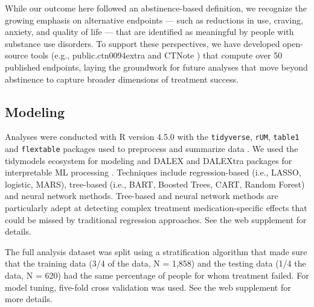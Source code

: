 \documentclass[
  number,
  preprint,
  3p,
  onecolumn]{elsarticle}
\begin{document}
While our outcome here followed an abstinence-based definition, we
recognize the growing emphasis on alternative endpoints --- such as
reductions in use, craving, anxiety, and quality of life --- that are
identified as meaningful by people with substance use disorders. To
support these perspectives, we have developed open-source tools (e.g.,
public.ctn0094extra \citep{public.ctn0094extra} and CTNote
\citep{CTNote}) that compute over 50 published endpoints, laying the
groundwork for future analyses that move beyond abstinence to capture
broader dimensions of treatment success.

\subsection{Modeling}\label{modeling}

Analyses were conducted with R version 4.5.0 with the
\texttt{tidyverse}, \texttt{rUM}, \texttt{table1} and \texttt{flextable}
packages used to preprocess and summarize data
\citep{R-base, R-tidyverse, tidyverse2019, R-rUM, R-table1}. We used the
tidymodels ecosystem for modeling and DALEX and DALEXtra packages for
interpretable ML processing \citep{R-tidymodels, DALEX, DALEXtra}.
Techniques include regression-based (i.e., LASSO, logistic, MARS),
tree-based (i.e., BART, Boosted Trees, CART, Random Forest) and neural
network methods. Tree-based and neural network methods are particularly
adept at detecting complex treatment medication-specific effects that
could be missed by traditional regression approaches. See the web
supplement \citep{balise_supplement_2025} for details.

The full analysis dataset was split using a stratification algorithm
that made sure that the training data (3/4 of the data, N = 1,858) and
the testing data (1/4 the data, N = 620) had the same percentage of
people for whom treatment failed. For model tuning, five-fold cross
validation was used. See the web supplement
\citep{balise_supplement_2025} for more details.
\end{document}
